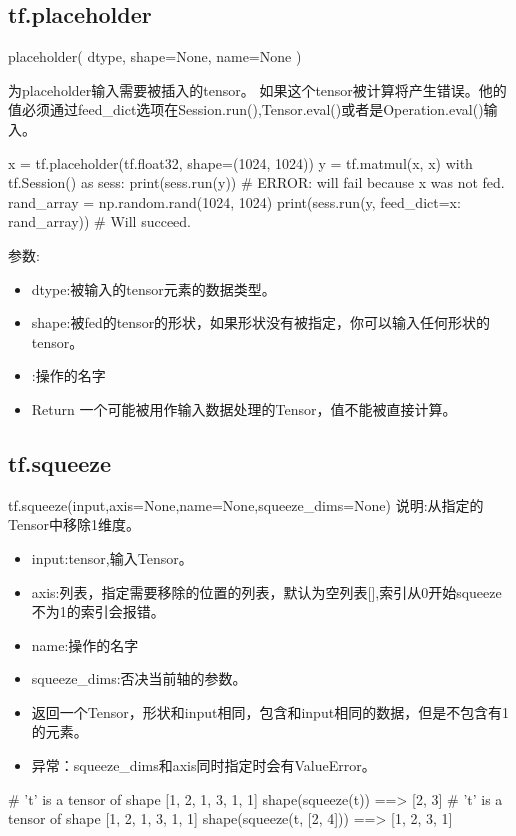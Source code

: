 \subsection{tf.placeholder}
\begin{python}
placeholder(
    dtype,
    shape=None,
    name=None
)
\end{python}
为placeholder输入需要被插入的tensor。
如果这个tensor被计算将产生错误。他的值必须通过feed\_dict选项在Session.run(),Tensor.eval()或者是Operation.eval()输入。
\begin{python}
x = tf.placeholder(tf.float32, shape=(1024, 1024))
y = tf.matmul(x, x)
with tf.Session() as sess:
    print(sess.run(y))  # ERROR: will fail because x was not fed.
    rand_array = np.random.rand(1024, 1024)
    print(sess.run(y, feed_dict={x: rand_array}))  # Will succeed.
\end{python}
参数:
\begin{itemize}
\item dtype:被输入的tensor元素的数据类型。
\item shape:被fed的tensor的形状，如果形状没有被指定，你可以输入任何形状的tensor。
\item:操作的名字
\item{Return} 一个可能被用作输入数据处理的Tensor，值不能被直接计算。
\end{itemize}
\subsection{tf.squeeze}
tf.squeeze(input,axis=None,name=None,squeeze\_dims=None)
说明:从指定的Tensor中移除1维度。
\begin{itemize}
\item input:tensor,输入Tensor。
\item axis:列表，指定需要移除的位置的列表，默认为空列表[],索引从0开始squeeze不为1的索引会报错。
\item name:操作的名字
\item squeeze\_dims:否决当前轴的参数。
\item 返回一个Tensor，形状和input相同，包含和input相同的数据，但是不包含有1的元素。
\item 异常：squeeze\_dims和axis同时指定时会有ValueError。
\end{itemize}
\# 't' is a tensor of shape [1, 2, 1, 3, 1, 1]\newline
shape(squeeze(t)) ==> [2, 3]\newline
\# 't' is a tensor of shape [1, 2, 1, 3, 1, 1]\newline
shape(squeeze(t, [2, 4])) ==> [1, 2, 3, 1]\newline
